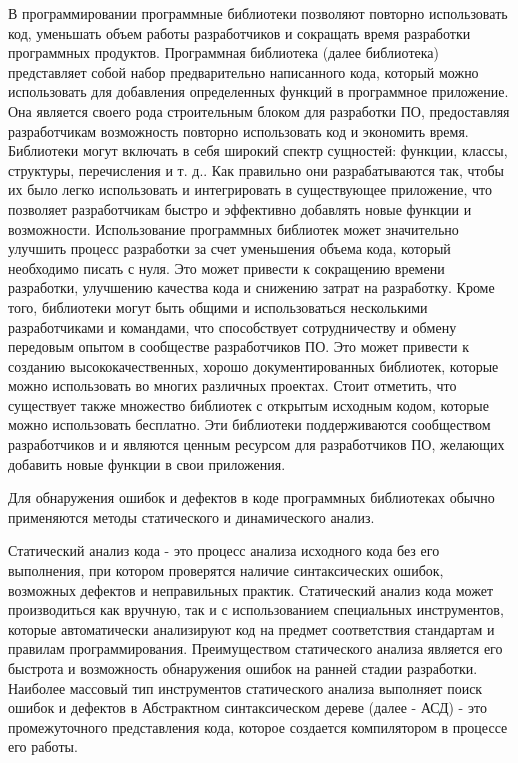 В программировании программные библиотеки позволяют повторно использовать код, уменьшать объем работы разработчиков и сокращать время разработки программных продуктов. Программная библиотека (далее библиотека) представляет собой набор предварительно написанного кода, который можно использовать для добавления определенных функций в программное приложение. Она является своего рода строительным блоком для разработки  ПО, предоставляя разработчикам возможность повторно использовать код и экономить время.
Библиотеки могут включать в себя широкий спектр сущностей: функции, классы, структуры, перечисления и т. д.. Как правильно они разрабатываются так, чтобы их было легко использовать и интегрировать в существующее приложение, что позволяет разработчикам быстро и эффективно добавлять новые функции и возможности.
Использование программных библиотек может значительно улучшить процесс разработки за счет уменьшения объема кода, который необходимо писать с нуля. Это может привести к сокращению времени разработки, улучшению качества кода и снижению затрат на разработку. Кроме того, библиотеки могут быть общими и использоваться несколькими разработчиками и командами, что способствует сотрудничеству и обмену передовым опытом в сообществе разработчиков ПО. Это может привести к созданию высококачественных, хорошо документированных библиотек, которые можно использовать во многих различных проектах.
Стоит отметить, что существует также множество библиотек с открытым исходным кодом, которые можно использовать бесплатно. Эти библиотеки поддерживаются сообществом разработчиков и и являются ценным ресурсом для разработчиков ПО, желающих добавить новые функции в свои приложения. 

Для обнаружения ошибок и дефектов в коде программных библиотеках обычно применяются методы статического и динамического анализ. 

Статический анализ кода - это процесс анализа исходного кода без его выполнения, при котором проверятся наличие синтаксических ошибок, возможных дефектов и неправильных практик. Статический анализ кода может производиться как вручную, так и с использованием специальных инструментов, которые автоматически анализируют код на предмет соответствия стандартам и правилам программирования. Преимуществом статического анализа является его быстрота и возможность обнаружения ошибок на ранней стадии разработки. Наиболее массовый тип инструментов статического анализа выполняет поиск ошибок и дефектов в Абстрактном синтаксическом дереве (далее - АСД) - это промежуточного представления кода, которое создается компилятором в процессе его работы.

